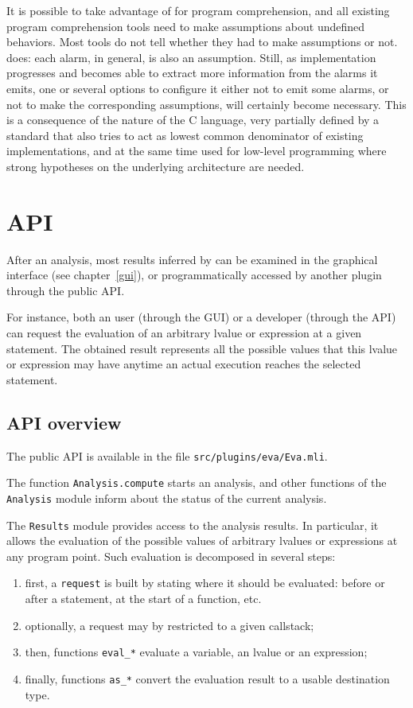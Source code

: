 \documentclass{frama-c-book}
\begin{document}
It is possible to take advantage of \Eva{}
for program comprehension, and all existing program comprehension
tools need to make assumptions about undefined behaviors. Most tools
do not tell whether they had to make assumptions or not.
\Eva{} does: each alarm, in general,
is also an assumption. Still, as implementation progresses
and \Eva{}
becomes able to extract more information from the alarms it emits,
one or several options
to configure it either not to emit some alarms, or not
to make the corresponding
assumptions, will certainly become necessary. This is a consequence
of the nature of the C language, very partially defined by a standard
that also tries to act as lowest common denominator of existing
implementations, and at the same time used for low-level programming
where strong hypotheses on the underlying architecture are needed.


\section{API}

After an analysis, most results inferred by \Eva{} can be examined in the
\FramaC graphical interface (see chapter \ref{gui}), or programmatically
accessed by another \FramaC plugin through the public \Eva{} API.

For instance, both an user (through the GUI) or a developer (through the API)
can request the evaluation of an arbitrary lvalue or expression at a given
statement.
The obtained result represents all the possible values that this lvalue or
expression may have anytime an actual execution reaches the selected statement.

\subsection{API overview}

The \Eva{} public API is available in the file \texttt{src/plugins/eva/Eva.mli}.

The function \lstinline|Analysis.compute| starts an analysis, and other
functions of the \lstinline|Analysis| module inform about the status of the
current analysis.

The \lstinline|Results| module provides access to the analysis results.
In particular, it allows the evaluation of the possible values of
arbitrary lvalues or expressions at any program point.
Such evaluation is decomposed in several steps:
\begin{enumerate}
\item first, a \lstinline|request| is built by stating where it should be
  evaluated: before or after a statement, at the start of a function, etc.
\item optionally, a request may by restricted to a given callstack;
\item then, functions \lstinline|eval_*| evaluate a variable, an lvalue or an
  expression;
\item finally, functions \lstinline|as_*| convert the evaluation result to a
  usable destination type.
\end{enumerate}
\end{document}
